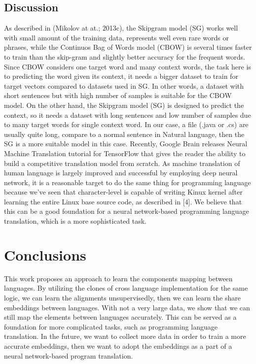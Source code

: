 \subsection{Discussion}
As described in (Mikolov at at.; 2013c), the Skipgram model (SG) works well with small amount of the training data, represents well even rare words or phrases, while the Continuos Bag of Words model (CBOW) is several times faster to train than the skip-gram and slightly better accuracy for the frequent words. Since CBOW considers one target word and many context words, the task here is to predicting the word given its context, it needs a bigger dataset to train for target vectors compared to datasets used in SG. In other words, a dataset with short sentences but with high number of samples is suitable for the CBOW model. On the other hand, the Skipgram model (SG) is designed to predict the context, so it needs a dataset with long sentences and low number of samples due to many target words for single context word. In our case, a file (.java or .cs) are usually quite long, compare to a normal sentence in Natural language, then the SG is a more suitable model in this case. 
Recently, Google Brain releases Neural Machine Translation tutorial for TensorFlow that gives the reader the ability to build a competitive translation model from scratch. As machine translation of human language is largely improved and successful by employing deep neural network, it is a reasonable target to do the same thing for programming language because we've seen that character-level is capable of writing Kinux kernel after learning the entire Linux base source code, as described in [4]. We believe that this can be a good foundation for a neural network-based programming language translation, which is a more sophisticated task. 

\section{Conclusions}
This work proposes an approach to learn the components mapping between languages. By utilizing the clones of cross language implementation for the same logic, we can learn the alignments unsupervisedly, then we can learn the share embeddings between languages. With not a very large data, we show that we can still map the elements between languages accurately. This can be served as a foundation for more complicated tasks, such as programming language translation. In the future, we want to collect more data in order to train a more accurate embeddings, then we want to adopt the embeddings as a part of a neural network-based program translation.



